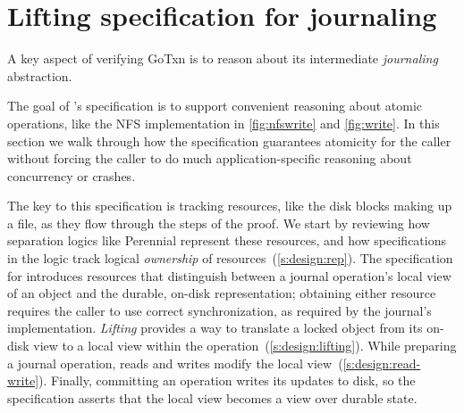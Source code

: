 \section{Lifting specification for journaling}%
\label{sec:txn:lifting}






\resume

A key aspect of verifying GoTxn is to reason about its intermediate
\emph{journaling} abstraction.

The goal of \txn's specification is to support convenient reasoning about atomic
operations, like the NFS  implementation in \cref{fig:nfswrite} and \cref{fig:write}.
In this section we walk through how the specification
guarantees atomicity for the caller without forcing the caller to do
much application-specific reasoning about concurrency or
crashes.

The key to this specification is tracking resources, like the disk blocks making up a
file, as they flow through the steps of the proof. We start by reviewing how
separation logics like Perennial represent these resources, and how
specifications in the logic track logical \emph{ownership} of
resources~(\cref{s:design:rep}). The specification for \txn introduces
resources that distinguish between a journal operation's local view of an object and
the durable, on-disk representation; obtaining either resource
requires the caller to use correct synchronization, as required by the journal's
implementation. \emph{Lifting} provides a
way to translate
a locked object from its on-disk view to a local view within the operation~(\cref{s:design:lifting}).
While preparing a journal operation, reads and writes modify the local
view~(\cref{s:design:read-write}). Finally, committing an operation writes
its updates to disk, so the specification asserts that the local
view becomes a view over durable state.


